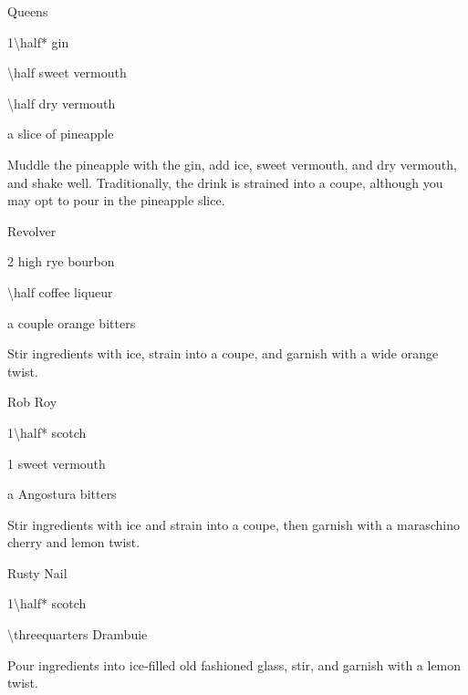 \begin{Cocktail}{Queens}
  \begin{Ingredients}
  \item \SI{1\half*}{\oz} gin
  \item \SI{\half}{\oz} sweet vermouth
  \item \SI{\half}{\oz} dry vermouth
  \item a slice of pineapple
  \end{Ingredients}
  
  \begin{Instructions}
	Muddle the pineapple with the gin, add ice, sweet vermouth, and dry vermouth, and shake well.  Traditionally, the drink is strained into a coupe, although you may opt to pour in the pineapple slice.
  \end{Instructions}
\end{Cocktail}

\begin{Cocktail}{Revolver}
  \begin{Ingredients}
  \item \SI{2}{\oz} high rye bourbon
  \item \SI{\half}{\oz} coffee liqueur
  \item a couple \si{\dashes} orange bitters
  \end{Ingredients}
  
  \begin{Instructions}
	Stir ingredients with ice, strain into a coupe, and garnish with a wide orange twist.
  \end{Instructions}
\end{Cocktail}

\begin{Cocktail}{Rob Roy}
  \begin{Ingredients}
  \item \SI{1\half*}{\oz} scotch
  \item \SI{1}{\oz} sweet vermouth
  \item a \si{\dash} Angostura bitters
  \end{Ingredients}
  
  \begin{Instructions}
	Stir ingredients with ice and strain into a coupe, then garnish with a maraschino cherry and lemon twist.
  \end{Instructions}
\end{Cocktail}

\begin{Cocktail}{Rusty Nail}
  \begin{Ingredients}
  \item \SI{1\half*}{\oz} scotch
  \item \SI{\threequarters}{\oz} Drambuie
  \end{Ingredients}
  
  \begin{Instructions}
	Pour ingredients into ice-filled old fashioned glass, stir, and garnish with a lemon twist.
  \end{Instructions}
\end{Cocktail}

